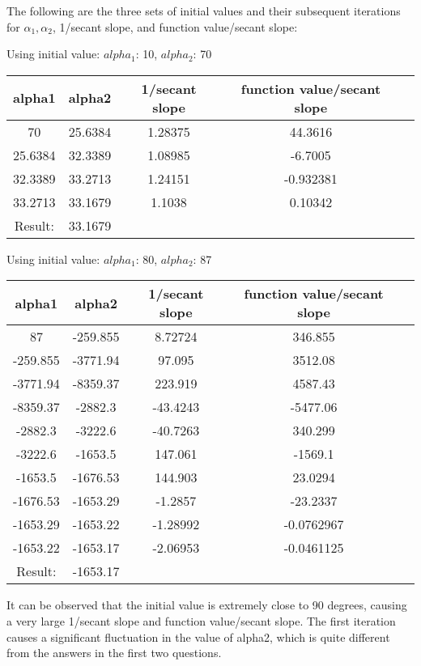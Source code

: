 \documentclass[a4paper]{article}
\begin{document}
The following are the three sets of initial values and their subsequent iterations for $\alpha_1, \alpha_2$, 1/secant slope, and function value/secant slope:
\begin{center}
Using initial value: $alpha_1$: 10, $alpha_2$: 70\\
\begin{tabular}{|c|c|c|c|c|}
\hline
alpha1 & alpha2 & 1/secant slope & function value/secant slope \\
\hline
70 & 25.6384 & 1.28375 & 44.3616 \\
25.6384 & 32.3389 & 1.08985 & -6.7005 \\
32.3389 & 33.2713 & 1.24151 & -0.932381 \\
33.2713 & 33.1679 & 1.1038 & 0.10342 \\
\hline
Result: & 33.1679 & & \\
\hline
\end{tabular}

Using initial value: $alpha_1$: 80, $alpha_2$: 87\\
\begin{tabular}{|c|c|c|c|c|}
\hline
alpha1 & alpha2 & 1/secant slope & function value/secant slope \\
\hline
87 & -259.855 & 8.72724 & 346.855 \\
-259.855 & -3771.94 & 97.095 & 3512.08 \\
-3771.94 & -8359.37 & 223.919 & 4587.43 \\
-8359.37 & -2882.3 & -43.4243 & -5477.06 \\
-2882.3 & -3222.6 & -40.7263 & 340.299 \\
-3222.6 & -1653.5 & 147.061 & -1569.1 \\
-1653.5 & -1676.53 & 144.903 & 23.0294 \\
-1676.53 & -1653.29 & -1.2857 & -23.2337 \\
-1653.29 & -1653.22 & -1.28992 & -0.0762967 \\
-1653.22 & -1653.17 & -2.06953 & -0.0461125 \\
\hline
Result: & -1653.17 & & \\
\hline
\end{tabular}
\end{center}
It can be observed that the initial value is extremely close to 90 degrees, causing a very large 1/secant slope and function value/secant slope. The first iteration causes a significant fluctuation in the value of alpha2, which is quite different from the answers in the first two questions.
\end{document}

